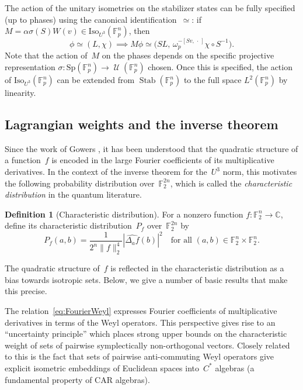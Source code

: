 \documentclass[11pt]{amsart}
\DeclareMathOperator{\Stab}{Stab}\DeclareMathOperator{\Spec}{Spec}
\newcommand{\C}{\mathbb{C}} %
\newcommand{\F}{\mathbb{F}} %
\newcommand{\Iso}{\mathrm{Iso}}
\newcommand{\Sp}{\mathrm{Sp}}
\DeclareMathOperator{\U}{\mathcal{U}}
\theoremstyle{plain}
\theoremstyle{definition}
\newtheorem{definition}[theorem]{Definition}
\theoremstyle{remark}
\begin{document}
The action of the unitary isometries on the stabilizer states can be fully specified (up to phases) using the canonical identification~$\simeq$:
if $M = \alpha \sigma(S) W(v) \in \Iso_{U^3}(\F_p^n)$, then
$$\phi\simeq (L, \chi) \implies M\phi \simeq \big(SL,\, \omega_p^{-[Sv,\, \cdot\,]} \chi\circ S^{-1}\big).$$
Note that the action of~$M$ on the phases depends on the specific projective representation $\sigma: \Sp(\F_p^n) \to \U(\F_p^n)$ chosen.
Once this is specified, the action of $\Iso_{U^3}(\F_p^n)$ can be extended from $\Stab(\F_p^n)$ to the full space $L^2(\F_p^n)$ by linearity.


\subsection{Lagrangian weights and the inverse theorem}

Since the work of Gowers \cite{Gowers1998}, it has been understood that the quadratic structure of a function~$f$ is encoded in the large Fourier coefficients of its multiplicative derivatives.
In the context of the inverse theorem for the~$U^3$ norm, this motivates the following probability distribution over~$\F_2^{2n}$, which is called the \emph{characteristic distribution} in the quantum literature.


\begin{definition}[Characteristic distribution] \label{def:char_dist}
    For a nonzero function $f:\F_2^n\to \C$, define its characteristic distribution~$P_f$ over~$\F_2^{2n}$ by
    \begin{equation*}
        P_f(a,b) = \frac{1}{2^n \|f\|_2^4}|\widehat{\Delta_af}(b)|^2 \quad \text{for all $(a, b) \in \F_2^n \times \F_2^n$.}
    \end{equation*}
\end{definition}

The quadratic structure of~$f$ is reflected in the characteristic distribution as a bias towards isotropic sets.
Below, we give a number of basic results that make this precise.

The relation~\eqref{eq:FourierWeyl} expresses Fourier coefficients of multiplicative derivatives in terms of the Weyl operators.
This perspective gives rise to an ``uncertainty principle'' which places strong upper bounds on the characteristic weight of sets of pairwise symplectically non-orthogonal vectors.
Closely related to this is the fact that sets of pairwise anti-commuting Weyl operators give explicit isometric embeddings of Euclidean spaces into~$C^*$ algebras (a fundamental property of CAR algebras).
\end{document}
